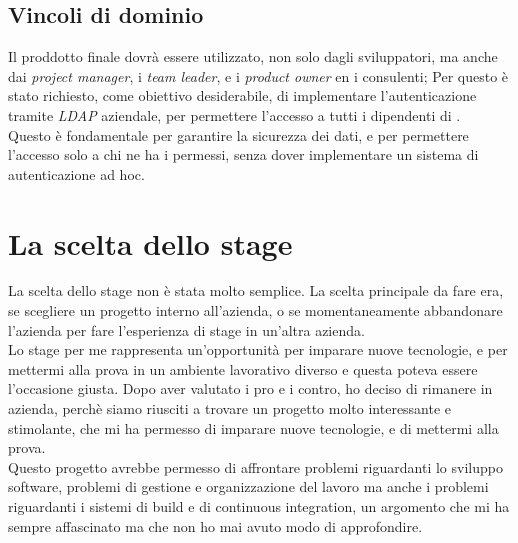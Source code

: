 \subsection*{ Vincoli di dominio}
Il proddotto finale dovrà essere utilizzato, non solo dagli sviluppatori, ma anche dai \textit{project manager}, i \textit{team leader}, e i \textit{product owner} en
i consulenti; Per questo è stato richiesto, come obiettivo desiderabile, di implementare l'autenticazione tramite \textit{LDAP} aziendale, 
per permettere l'accesso a tutti i dipendenti di {\azienda}.\\
Questo è fondamentale per garantire la sicurezza dei dati, e per permettere l'accesso solo a chi ne ha i permessi, senza dover
implementare un sistema di autenticazione ad hoc.\\



\section{La scelta dello stage}
La scelta dello stage non è stata molto semplice. La scelta principale da fare era, se scegliere un progetto interno all'azienda, o 
se momentaneamente abbandonare l'azienda per fare l'esperienza di stage in un'altra azienda.\\ 
Lo stage per me rappresenta un'opportunità per imparare nuove tecnologie, e per mettermi alla prova in un ambiente lavorativo diverso 
e questa poteva essere l'occasione giusta. Dopo aver valutato i pro e i contro, ho deciso di rimanere in azienda, perchè siamo riusciti
a trovare un progetto molto interessante e stimolante, che mi ha permesso di imparare nuove tecnologie, e di mettermi alla prova.\\

Questo progetto avrebbe permesso di affrontare problemi riguardanti lo sviluppo software, problemi di gestione e organizzazione del lavoro ma 
anche i problemi riguardanti i sistemi di build e di continuous integration, un argomento che mi ha sempre affascinato ma che non ho mai
avuto modo di approfondire.\\

